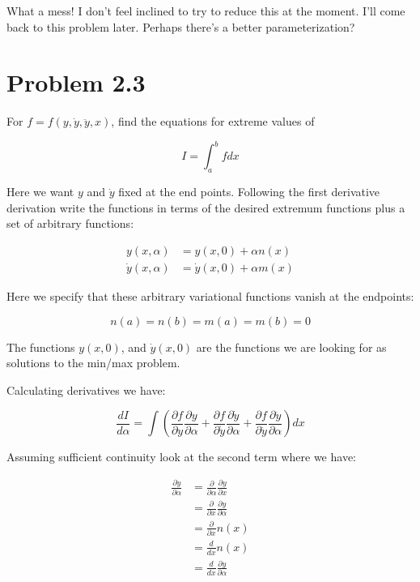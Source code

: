 \documentclass{article}      %
\newcommand{\ydot}[0]{\dot{y}}
\newcommand{\yddot}[0]{\ddot{y}}
\newcommand{\PD}[2]{\frac{\partial {#2}}{\partial {#1}}}
\begin{document}
What a mess!  I don't feel inclined to try to reduce this at the moment.  I'll come back to this problem later.  Perhaps there's a better parameterization?

\section{ Problem 2.3 }

For $f = f( y, \ydot, \yddot, x )$, find the equations for extreme values of

\begin{equation*}
I = \int_a^b f dx
\end{equation*}

Here we want $y$ and $\ydot$ fixed at the end points.  Following the first derivative derivation write the 
functions in terms of the desired extremum functions plus a set of arbitrary functions:

\begin{align*}
y( x, \alpha ) &= y( x, 0 ) + \alpha n(x) \\
\ydot( x, \alpha ) &= \ydot( x, 0 ) + \alpha m(x)
\end{align*}

Here we specify that these arbitrary variational functions vanish at the endpoints:

\begin{equation*}
n(a) = n(b) = m(a) = m(b) = 0
\end{equation*}

The functions $y(x, 0)$, and $\ydot(x, 0)$ are the functions we are looking for as solutions to the min/max problem.

Calculating derivatives we have:

\begin{equation*}
\frac{dI}{d\alpha} = 
\int \left( 
\PD{y}{f} \PD{\alpha}{y}
+\PD{\ydot}{f} \PD{\alpha}{\ydot}
+\PD{\yddot}{f} \PD{\alpha}{\yddot}
\right) d x
\end{equation*}

Assuming sufficient continuity look at the second term where we have:

\begin{align*}
\PD{\alpha}{\ydot} 
&= \PD{\alpha}{} \PD{x}{y} \\
&= \PD{x}{} \PD{\alpha}{y} \\
&= \PD{x}{} n(x) \\
&= \frac{d}{ d x} n(x) \\
&= \frac{d}{ d x} \PD{\alpha}{y} \\
\end{align*}
\end{document}
